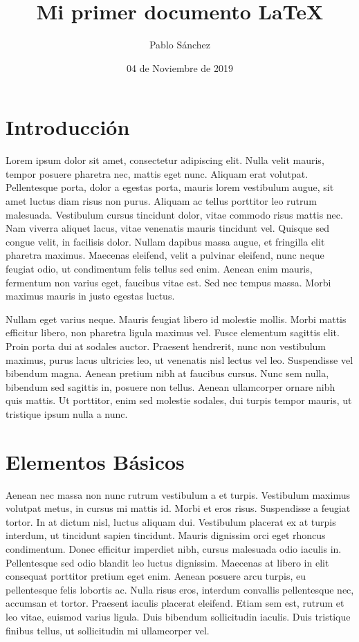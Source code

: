 \documentclass{article}
\title{Mi primer documento \LaTeX}
\author{Pablo Sánchez}
\date{04 de Noviembre de 2019}
\begin{document}
\maketitle

\tableofcontents

\listoffigures

\listoftables

\lstlistoflistings

\pagebreak

\section{Introducción}

Lorem ipsum dolor sit amet, consectetur adipiscing elit. Nulla velit mauris, tempor posuere pharetra nec, mattis eget nunc. Aliquam erat volutpat. Pellentesque porta, dolor a egestas porta, mauris lorem vestibulum augue, sit amet luctus diam risus non purus. Aliquam ac tellus porttitor leo rutrum malesuada. Vestibulum cursus tincidunt dolor, vitae commodo risus mattis nec. Nam viverra aliquet lacus, vitae venenatis mauris tincidunt vel. Quisque sed congue velit, in facilisis dolor. Nullam dapibus massa augue, et fringilla elit pharetra maximus. Maecenas eleifend, velit a pulvinar eleifend, nunc neque feugiat odio, ut condimentum felis tellus sed enim. Aenean enim mauris, fermentum non varius eget, faucibus vitae est. Sed nec tempus massa. Morbi maximus mauris in justo egestas luctus.

Nullam eget varius neque. Mauris feugiat libero id molestie mollis. Morbi mattis efficitur libero, non pharetra ligula maximus vel. Fusce elementum sagittis elit. Proin porta dui at sodales auctor. Praesent hendrerit, nunc non vestibulum maximus, purus lacus ultricies leo, ut venenatis nisl lectus vel leo. Suspendisse vel bibendum magna. Aenean pretium nibh at faucibus cursus. Nunc sem nulla, bibendum sed sagittis in, posuere non tellus. Aenean ullamcorper ornare nibh quis mattis. Ut porttitor, enim sed molestie sodales, dui turpis tempor mauris, ut tristique ipsum nulla a nunc.

\section{Elementos Básicos}

Aenean nec massa non nunc rutrum vestibulum a et turpis. Vestibulum maximus volutpat metus, in cursus mi mattis id. Morbi et eros risus. Suspendisse a feugiat tortor. In at dictum nisl, luctus aliquam dui. Vestibulum placerat ex at turpis interdum, ut tincidunt sapien tincidunt. Mauris dignissim orci eget rhoncus condimentum. Donec efficitur imperdiet nibh, cursus malesuada odio iaculis in. Pellentesque sed odio blandit leo luctus dignissim. Maecenas at libero in elit consequat porttitor pretium eget enim. Aenean posuere arcu turpis, eu pellentesque felis lobortis ac. Nulla risus eros, interdum convallis pellentesque nec, accumsan et tortor. Praesent iaculis placerat eleifend. Etiam sem est, rutrum et leo vitae, euismod varius ligula. Duis bibendum sollicitudin iaculis. Duis tristique finibus tellus, ut sollicitudin mi ullamcorper vel.
\end{document}
